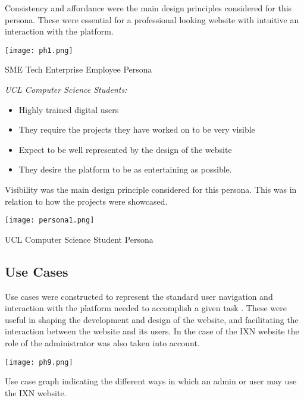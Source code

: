 \documentclass[fontsize=11pt]{extarticle}
\numberwithin{figure}{section} %
\numberwithin{table}{section}%
\providecommand{\tightlist}{%
  \setlength{\itemsep}{0pt}\setlength{\parskip}{0pt}}
\begin{document}
Consistency and affordance were the main design principles considered
for this persona. These were essential for a professional looking
website ​with intuitive an interaction with the platform. ​

\begin{table}[H]
      \centering
      \texttt{[image: ph1.png]}
      \caption{SME Tech Enterprise Employee Persona}
\end{table}

\emph{UCL Computer Science Students: ​}

\begin{itemize}
\tightlist
\item
  Highly trained digital users​
\item
  They require the projects they have worked on to be very visible​
\item
  Expect to be well represented by the design of the website​
\item
  They desire the platform to be as entertaining as possible. ​
\end{itemize}

Visibility was the main design principle considered for this persona.
This was in relation to how the projects were showcased. ​

\begin{table}[H]
      \centering
      \texttt{[image: persona1.png]}
      \caption{UCL Computer Science Student Persona}
\end{table}

\hypertarget{use-cases}{%
\subsection{Use Cases}\label{use-cases}}

Use cases were constructed to represent the standard user navigation and
interaction with the platform needed to accomplish a given task
\cite{g3}. These were useful in shaping the development and design of
the website, and facilitating the interaction between the website and
its users. In the case of the IXN website the role of the administrator
was also taken into account.

\begin{table}[H]
      \centering
      \texttt{[image: ph9.png]}
      \caption{Use case graph indicating the different ways in which an admin or user may use the IXN website.}
\end{table}
\end{document}
